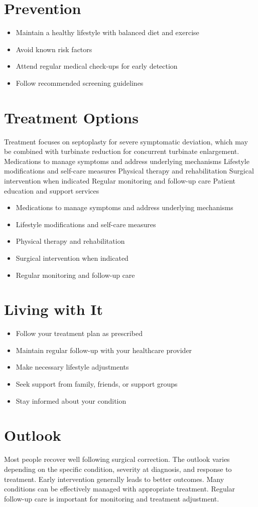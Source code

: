 \section{Prevention}
\begin{itemize}[noitemsep]
  \item Maintain a healthy lifestyle with balanced diet and exercise
  \item Avoid known risk factors
  \item Attend regular medical check-ups for early detection
  \item Follow recommended screening guidelines
\end{itemize}
\section{Treatment Options}
Treatment focuses on septoplasty for severe symptomatic deviation, which may be combined with turbinate reduction for concurrent turbinate enlargement. Medications to manage symptoms and address underlying mechanisms Lifestyle modifications and self-care measures Physical therapy and rehabilitation Surgical intervention when indicated Regular monitoring and follow-up care Patient education and support services

\begin{itemize}[noitemsep]
  \item Medications to manage symptoms and address underlying mechanisms
  \item Lifestyle modifications and self-care measures
  \item Physical therapy and rehabilitation
  \item Surgical intervention when indicated
  \item Regular monitoring and follow-up care
\end{itemize}
\section{Living with It}
\begin{itemize}[noitemsep]
  \item Follow your treatment plan as prescribed
  \item Maintain regular follow-up with your healthcare provider
  \item Make necessary lifestyle adjustments
  \item Seek support from family, friends, or support groups
  \item Stay informed about your condition
\end{itemize}
\section{Outlook}
Most people recover well following surgical correction. The outlook varies depending on the specific condition, severity at diagnosis, and response to treatment. Early intervention generally leads to better outcomes. Many conditions can be effectively managed with appropriate treatment. Regular follow-up care is important for monitoring and treatment adjustment.
